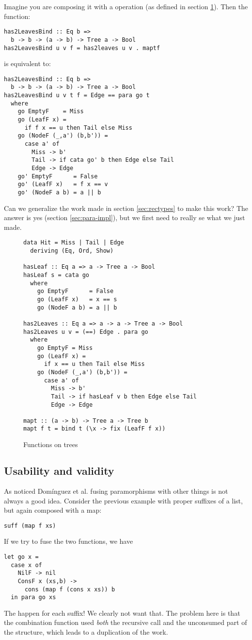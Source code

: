 Imagine you are composing it with a  operation (as defined in section \ref{fig:has2Leaves}). Then
the function:
\begin{verbatim}
has2LeavesBind :: Eq b =>
  b -> b -> (a -> b) -> Tree a -> Bool
has2LeavesBind u v f = has2leaves u v . maptf
\end{verbatim}
\noindent is equivalent to:
\begin{verbatim}
has2LeavesBind :: Eq b =>
  b -> b -> (a -> b) -> Tree a -> Bool
has2LeavesBind u v t f = Edge == para go t
  where
    go EmptyF    = Miss
    go (LeafF x) =
      if f x == u then Tail else Miss
    go (NodeF (_,a') (b,b')) =
      case a' of
        Miss -> b'
        Tail -> if cata go' b then Edge else Tail
        Edge -> Edge
    go' EmptyF      = False
    go' (LeafF x)   = f x == v
    go' (NodeF a b) = a || b
\end{verbatim}

Can we generalize the work made in section \ref{sec:rectypes} to make this work? The answer is yes (section \ref{sec:para-impl}), but we first need to really se what we just made.

\begin{figure}
\begin{verbatim}
data Hit = Miss | Tail | Edge
  deriving (Eq, Ord, Show)

hasLeaf :: Eq a => a -> Tree a -> Bool
hasLeaf s = cata go
  where
    go EmptyF      = False
    go (LeafF x)   = x == s
    go (NodeF a b) = a || b

has2Leaves :: Eq a => a -> a -> Tree a -> Bool
has2Leaves u v = (==) Edge . para go
  where
    go EmptyF = Miss
    go (LeafF x) =
      if x == u then Tail else Miss
    go (NodeF (_,a') (b,b')) =
      case a' of
        Miss -> b'
        Tail -> if hasLeaf v b then Edge else Tail
        Edge -> Edge

mapt :: (a -> b) -> Tree a -> Tree b
mapt f t = bind t (\x -> fix (LeafF f x))
\end{verbatim}
\caption{Functions on trees}
\label{fig:has2Leaves}
\end{figure}

\subsection{Usability and validity}
As noticed Domínguez et al. \cite{paramorphismFusion} fusing paramorphisms with other things is not always a good idea. Consider the previous example with proper suffixes of a list, but again composed with a map:
\begin{verbatim}
suff (map f xs)
\end{verbatim}
\noindent If we try to fuse the two functions, we have
\begin{verbatim}
let go x =
  case x of
    NilF -> nil
    ConsF x (xs,b) -> 
      cons (map f (cons x xs)) b
  in para go xs
\end{verbatim}
\noindent The  happen for each suffix! We clearly not want that.
The problem here is that the combination function used \emph{both} the recursive call and the unconsumed part of the structure, which leads to a duplication of the work.

